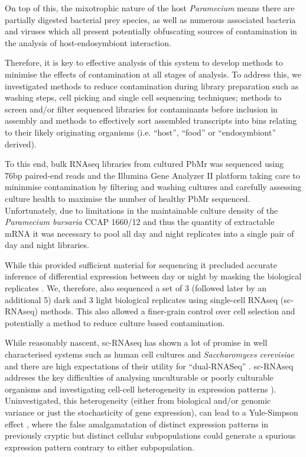 On top of this, the mixotrophic nature of the host \textit{Paramecium} \citep{Dolan1992} means there 
are partially digested bacterial prey species, as well as numerous 
associated bacteria \citep{Gortz2009,Fokin2009,Schrallhammer2009} and viruses \citep{VanEtten1983} which
all present potentially obfuscating sources of contamination in the analysis of host-endosymbiont
interaction.  


Therefore, it is key to effective analysis of this system to develop methods
to minimise the effects of contamination at all stages of analysis.  To address this,
we investigated methods to reduce contamination during library preparation such as washing steps, cell picking
and single cell sequencing techniques; methods to screen and/or filter sequenced libraries
for contaminants before inclusion in assembly and methods to effectively sort
assembled transcripts into bins relating to their likely originating organisms
(i.e. ``host'', ``food'' or ``endosymbiont'' derived).



To this end, bulk RNAseq libraries from cultured PbMr was sequenced using 76bp paired-end reads and the Illumina Gene Analyzer II platform 
taking care to mininmise contamination by filtering and washing cultures and carefully
assessing culture health to maximise the number of healthy PbMr sequenced. 
Unfortunately, due to limitations in the maintainable culture density of the 
\textit{Paramecium bursaria} CCAP 1660/12 and thus the quantity of extractable
mRNA it was necessary to pool all day and night replicates into a single pair of day and night libraries. 

While this provided sufficient material for sequencing it precluded accurate inference of differential expression between day or night
by masking the biological replicates \citep{Auer2010}.
We, therefore, also sequenced a set of 3 (followed later by an additional 5) dark and 3 light
biological replicates using single-cell RNAseq (sc-RNAseq) methods.
This also allowed a finer-grain control over cell selection and potentially
a method to reduce culture based contamination.


While reasonably nascent, sc-RNAseq has shown a lot of promise in well characterised systems such as human cell cultures \citep{Bengtsson2005,Shalek2013}
and \textit{Saccharomyces cerevisiae} \citep{Lipson2009} and there are high expectations
of their utility for ``dual-RNASeq'' \citep{Westermann2012}.  sc-RNAseq addreses 
the key difficulties of analysing unculturable or poorly culturable organisms \citep{Murray2012} and investigating
cell-cell heterogeneity in expression patterns \citep{Raj2008,Shalek2013}).  
Uninvestigated, this heterogeneity (either from biological and/or genomic variance or just the stochasticity of gene expression),
can lead to a Yule-Simpson effect \citep{Yule1903a,Simpson1951}, where the false amalgamatation of distinct expression patterns
in previously cryptic but distinct cellular subpopulations could generate a spurious expression pattern contrary to either subpopulation.


